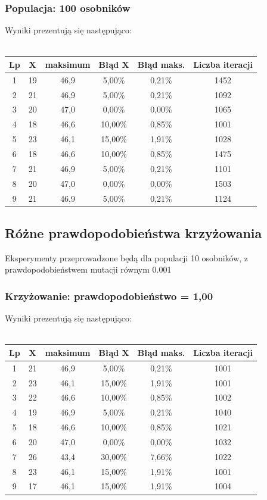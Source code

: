\documentclass[a4paper,11pt]{article}
\begin{document}
			\subsubsection{Populacja: 100 osobników}
				Wyniki prezentują się następująco:\\~\\
				\begin{tabular}{|c|c|c|c|c|c|}
					\hline 
					Lp & X & maksimum & Błąd X & Błąd maks. & Liczba iteracji\\
					\hline
					1 &19 & 46,9 & 5,00\% & 0,21\% & 1452\\\hline
					2 & 21  & 46,9 & 5,00\% & 0,21\% & 1092 \\\hline
					3 & 20 & 47,0 & 0,00\% & 0,00\% & 1065\\\hline
					4 & 18 & 46,6 & 10,00\% & 0,85\% & 1001 \\\hline
					5 & 23 & 46,1 & 15,00\% & 1,91\% & 1028 \\\hline
					6 & 18 & 46,6 & 10,00\% & 0,85\% & 1475\\\hline
					7 & 21 & 46,9 & 5,00\% & 0,21\% & 1101\\\hline
					8 & 20 & 47,0 & 0,00\% & 0,00\% & 1503\\\hline
					9  & 21 & 46,9 & 5,00\% & 0,21\% & 1124\\\hline
				\end{tabular} 
			\subsection{Różne prawdopodobieństwa krzyżowania}
				Eksperymenty przeprowadzone będą dla populacji 10 osobników, z prawdopodobieństwem mutacji równym 0.001
				\subsubsection{Krzyżowanie: prawdopodobieństwo = 1,00}
					Wyniki prezentują się następująco:\\~\\
					\begin{tabular}{|c|c|c|c|c|c|}
						\hline 
						Lp & X & maksimum & Błąd X & Błąd maks. & Liczba iteracji\\\hline
						1 &21 & 46,9 & 5,00\% &0,21\%  &1001\\\hline
						2 & 23 & 46,1 & 15,00\% & 1,91\% &1001 \\\hline
						3 & 22 & 46,6 & 10,00\% &0,85\% &1002 \\\hline
						4 & 19 & 46,9 & 5,00\% & 0,21\%&1040 \\\hline
						5 & 18 & 46,6 & 10,00\% & 0,85\%&1021 \\\hline
						6 & 20 & 47,0 & 0,00\% & 0,00\%& 1032 \\\hline
						7 & 26 & 43,4 & 30,00\% & 7,66\%& 1022 \\\hline
						8 & 23 & 46,1 & 15,00\% & 1,91\%& 1001 \\\hline
						9  & 17 & 46,1&15,00\%  & 1,91\%& 1004 \\\hline
					\end{tabular} 
\end{document}

